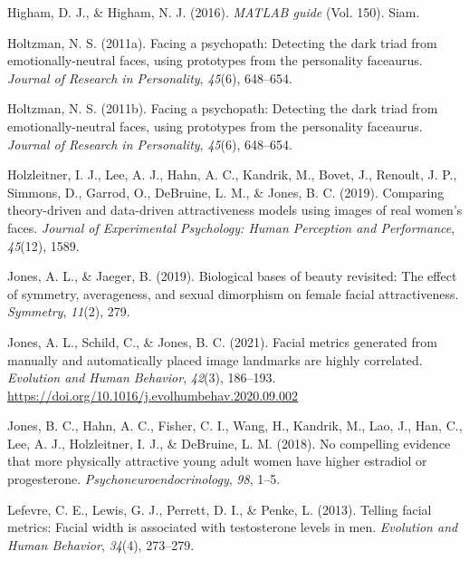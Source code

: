 \documentclass[
  doc,floatsintext]{apa6}
\newlength{\cslhangindent}
\newlength{\cslentryspacingunit} %
\newenvironment{CSLReferences}[2] %
 {%
  \setlength{\parindent}{0pt}
  \ifodd #1
  \let\oldpar\par
  \def\par{\hangindent=\cslhangindent\oldpar}
  \fi
  \setlength{\parskip}{#2\cslentryspacingunit}
 }%
 {}
\begin{document}
\begin{CSLReferences}{1}{0}
\leavevmode{}%
Higham, D. J., \& Higham, N. J. (2016). \emph{MATLAB guide} (Vol. 150). Siam.

\leavevmode{}%
Holtzman, N. S. (2011a). Facing a psychopath: Detecting the dark triad from emotionally-neutral faces, using prototypes from the personality faceaurus. \emph{Journal of Research in Personality}, \emph{45}(6), 648--654.

\leavevmode{}%
Holtzman, N. S. (2011b). Facing a psychopath: Detecting the dark triad from emotionally-neutral faces, using prototypes from the personality faceaurus. \emph{Journal of Research in Personality}, \emph{45}(6), 648--654.

\leavevmode{}%
Holzleitner, I. J., Lee, A. J., Hahn, A. C., Kandrik, M., Bovet, J., Renoult, J. P., Simmons, D., Garrod, O., DeBruine, L. M., \& Jones, B. C. (2019). Comparing theory-driven and data-driven attractiveness models using images of real women's faces. \emph{Journal of Experimental Psychology: Human Perception and Performance}, \emph{45}(12), 1589.

\leavevmode{}%
Jones, A. L., \& Jaeger, B. (2019). Biological bases of beauty revisited: The effect of symmetry, averageness, and sexual dimorphism on female facial attractiveness. \emph{Symmetry}, \emph{11}(2), 279.

\leavevmode{}%
Jones, A. L., Schild, C., \& Jones, B. C. (2021). Facial metrics generated from manually and automatically placed image landmarks are highly correlated. \emph{Evolution and Human Behavior}, \emph{42}(3), 186--193. \url{https://doi.org/10.1016/j.evolhumbehav.2020.09.002}

\leavevmode{}%
Jones, B. C., Hahn, A. C., Fisher, C. I., Wang, H., Kandrik, M., Lao, J., Han, C., Lee, A. J., Holzleitner, I. J., \& DeBruine, L. M. (2018). No compelling evidence that more physically attractive young adult women have higher estradiol or progesterone. \emph{Psychoneuroendocrinology}, \emph{98}, 1--5.

\leavevmode{}%
Lefevre, C. E., Lewis, G. J., Perrett, D. I., \& Penke, L. (2013). Telling facial metrics: Facial width is associated with testosterone levels in men. \emph{Evolution and Human Behavior}, \emph{34}(4), 273--279.


\end{CSLReferences}
\end{document}
